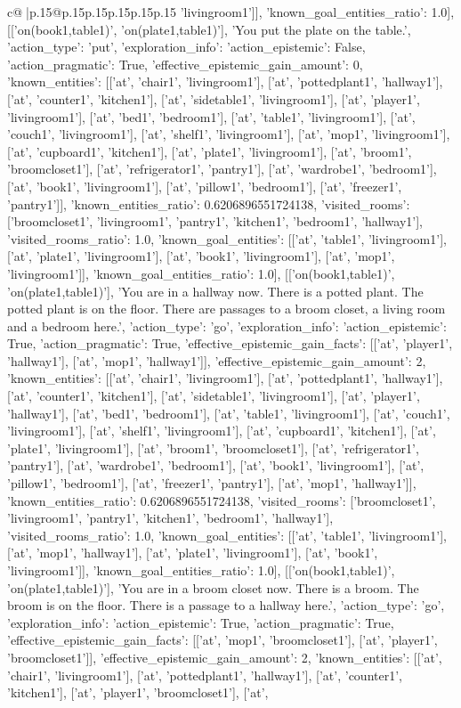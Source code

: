 \documentclass{article}
\begin{document}
{\begin{supertabular}{c@{$\;$}|p{.15\linewidth}@{}p{.15\linewidth}p{.15\linewidth}p{.15\linewidth}p{.15\linewidth}p{.15\linewidth}}
{{{'livingroom1']], 'known_goal_entities_ratio': 1.0}}], [['on(book1,table1)', 'on(plate1,table1)'], 'You put the plate on the table.', {'action_type': 'put', 'exploration_info': {'action_epistemic': False, 'action_pragmatic': True, 'effective_epistemic_gain_amount': 0, 'known_entities': [['at', 'chair1', 'livingroom1'], ['at', 'pottedplant1', 'hallway1'], ['at', 'counter1', 'kitchen1'], ['at', 'sidetable1', 'livingroom1'], ['at', 'player1', 'livingroom1'], ['at', 'bed1', 'bedroom1'], ['at', 'table1', 'livingroom1'], ['at', 'couch1', 'livingroom1'], ['at', 'shelf1', 'livingroom1'], ['at', 'mop1', 'livingroom1'], ['at', 'cupboard1', 'kitchen1'], ['at', 'plate1', 'livingroom1'], ['at', 'broom1', 'broomcloset1'], ['at', 'refrigerator1', 'pantry1'], ['at', 'wardrobe1', 'bedroom1'], ['at', 'book1', 'livingroom1'], ['at', 'pillow1', 'bedroom1'], ['at', 'freezer1', 'pantry1']], 'known_entities_ratio': 0.6206896551724138, 'visited_rooms': ['broomcloset1', 'livingroom1', 'pantry1', 'kitchen1', 'bedroom1', 'hallway1'], 'visited_rooms_ratio': 1.0, 'known_goal_entities': [['at', 'table1', 'livingroom1'], ['at', 'plate1', 'livingroom1'], ['at', 'book1', 'livingroom1'], ['at', 'mop1', 'livingroom1']], 'known_goal_entities_ratio': 1.0}}], [['on(book1,table1)', 'on(plate1,table1)'], 'You are in a hallway now. There is a potted plant. The potted plant is on the floor. There are passages to a broom closet, a living room and a bedroom here.', {'action_type': 'go', 'exploration_info': {'action_epistemic': True, 'action_pragmatic': True, 'effective_epistemic_gain_facts': [['at', 'player1', 'hallway1'], ['at', 'mop1', 'hallway1']], 'effective_epistemic_gain_amount': 2, 'known_entities': [['at', 'chair1', 'livingroom1'], ['at', 'pottedplant1', 'hallway1'], ['at', 'counter1', 'kitchen1'], ['at', 'sidetable1', 'livingroom1'], ['at', 'player1', 'hallway1'], ['at', 'bed1', 'bedroom1'], ['at', 'table1', 'livingroom1'], ['at', 'couch1', 'livingroom1'], ['at', 'shelf1', 'livingroom1'], ['at', 'cupboard1', 'kitchen1'], ['at', 'plate1', 'livingroom1'], ['at', 'broom1', 'broomcloset1'], ['at', 'refrigerator1', 'pantry1'], ['at', 'wardrobe1', 'bedroom1'], ['at', 'book1', 'livingroom1'], ['at', 'pillow1', 'bedroom1'], ['at', 'freezer1', 'pantry1'], ['at', 'mop1', 'hallway1']], 'known_entities_ratio': 0.6206896551724138, 'visited_rooms': ['broomcloset1', 'livingroom1', 'pantry1', 'kitchen1', 'bedroom1', 'hallway1'], 'visited_rooms_ratio': 1.0, 'known_goal_entities': [['at', 'table1', 'livingroom1'], ['at', 'mop1', 'hallway1'], ['at', 'plate1', 'livingroom1'], ['at', 'book1', 'livingroom1']], 'known_goal_entities_ratio': 1.0}}], [['on(book1,table1)', 'on(plate1,table1)'], 'You are in a broom closet now. There is a broom. The broom is on the floor. There is a passage to a hallway here.', {'action_type': 'go', 'exploration_info': {'action_epistemic': True, 'action_pragmatic': True, 'effective_epistemic_gain_facts': [['at', 'mop1', 'broomcloset1'], ['at', 'player1', 'broomcloset1']], 'effective_epistemic_gain_amount': 2, 'known_entities': [['at', 'chair1', 'livingroom1'], ['at', 'pottedplant1', 'hallway1'], ['at', 'counter1', 'kitchen1'], ['at', 'player1', 'broomcloset1'], ['at', }}}
\end{supertabular}}
\end{document}
